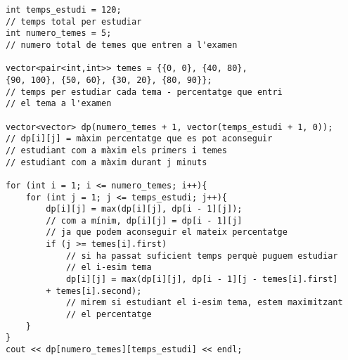 \begin{lstlisting}
int temps_estudi = 120;
// temps total per estudiar
int numero_temes = 5;
// numero total de temes que entren a l'examen

vector<pair<int,int>> temes = {{0, 0}, {40, 80},
{90, 100}, {50, 60}, {30, 20}, {80, 90}};
// temps per estudiar cada tema - percentatge que entri
// el tema a l'examen

vector<vector> dp(numero_temes + 1, vector(temps_estudi + 1, 0));
// dp[i][j] = màxim percentatge que es pot aconseguir
// estudiant com a màxim els primers i temes
// estudiant com a màxim durant j minuts

for (int i = 1; i <= numero_temes; i++){
    for (int j = 1; j <= temps_estudi; j++){
        dp[i][j] = max(dp[i][j], dp[i - 1][j]);
        // com a mínim, dp[i][j] = dp[i - 1][j]
        // ja que podem aconseguir el mateix percentatge
        if (j >= temes[i].first)
            // si ha passat suficient temps perquè puguem estudiar
            // el i-esim tema
            dp[i][j] = max(dp[i][j], dp[i - 1][j - temes[i].first]
        + temes[i].second);
            // mirem si estudiant el i-esim tema, estem maximitzant
            // el percentatge
    }
}
cout << dp[numero_temes][temps_estudi] << endl;
\end{lstlisting}

